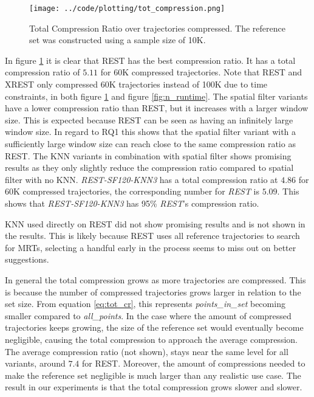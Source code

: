 \begin{figure}[h]
    \begin{minipage}{0.99\linewidth}
        \centering
        \texttt{[image: ../code/plotting/tot\_compression.png]}
        \caption{Total Compression Ratio over trajectories compressed. The reference set was constructed using a sample size of 10K.}
        \label{fig:n_compression}
    \end{minipage}
\end{figure}

In figure \ref{fig:n_compression} it is clear that REST has the best compression ratio. It has a total compression ratio of $5.11$ for 60K compressed trajectories. Note that REST and XREST only compressed 60K trajectories instead of 100K due to time constraints, in both figure \ref{fig:n_compression} and figure \ref{fig:n_runtime}. The spatial filter variants have a lower compression ratio than REST, but it increases with a larger window size. This is expected because REST can be seen as having an infinitely large window size. In regard to RQ1 this shows that the spatial filter variant with a sufficiently large window size can reach close to the same compression ratio as REST. The KNN variants in combination with spatial filter shows promising results as they only slightly reduce the compression ratio compared to spatial filter with no KNN. \textit{REST-SF120-KNN3} has a total compression ratio at $4.86$ for 60K compressed trajectories, the corresponding number for \textit{REST} is $5.09$. This shows that \textit{REST-SF120-KNN3} has 95\% \textit{REST}'s compression ratio.

KNN used directly on REST did not show promising results and is not shown in the results. This is likely because REST uses all reference trajectories to search for MRTs, selecting a handful early in the process seems to miss out on better suggestions.

In general the total compression grows as more trajectories are compressed. This is because the number of compressed trajectories grows larger in relation to the set size. From equation \ref{eq:tot_cr}, this represents \textit{points\_in\_set} becoming smaller compared to \textit{all\_points}. In the case where the amount of compressed trajectories keeps growing, the size of the reference set would eventually become negligible, causing the total compression to approach the average compression. The average compression ratio (not shown), stays near the same level for all variants, around $7.4$ for REST. Moreover, the amount of compressions needed to make the reference set negligible is much larger than any realistic use case. The result in our experiments is that the total compression grows slower and slower.


